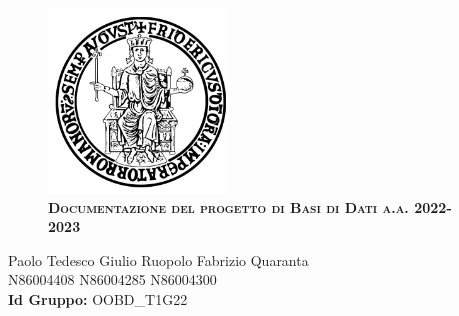 \documentclass{report}
\begin{document}
    \begin{figure}[htbp!]
        \begin{center}
            \includegraphics[width=.40\textwidth]{Immagini/FedericoII.png}
             \\{\scshape\LARGE\bfseries Documentazione del progetto di Basi di Dati a.a. 2022-2023 }
        \end{center}
    \end{figure}
    
   
    
    
    \begin{center}
    \Large
     Paolo Tedesco Giulio Ruopolo Fabrizio Quaranta\\
     N86004408 N86004285 N86004300\\
     {\bf Id Gruppo:} OOBD\_T1G22\\
    \end{center}

    
    
    \newpage
    
    \tableofcontents
    
    
    
    
    
    
\end{document}
